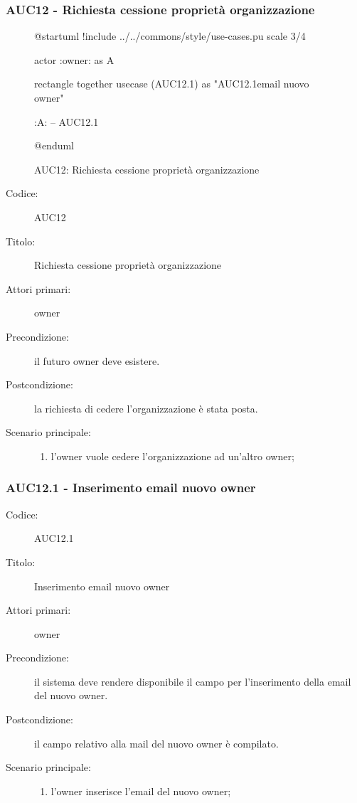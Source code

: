 \documentclass[../analisi-dei-requisiti.tex]{subfiles}
\begin{document}
\subsubsection{AUC12 - Richiesta cessione proprietà organizzazione}%
\label{subsub:AUC12}

\begin{figure}[h!]
  \centering
  \begin{plantuml}
  @startuml
  !include ../../commons/style/use-cases.pu
  scale 3/4

  actor :owner: as A

  rectangle {
    together {
      usecase (AUC12.1) as "AUC12.1\nInserimento email nuovo owner"
    }
  }

  :A: -- AUC12.1

  @enduml
  \end{plantuml}
  \caption{AUC12: Richiesta cessione proprietà organizzazione}
  \label{fig:auc12}
\end{figure}

\begin{description}
  \item[Codice:] AUC12
  \item[Titolo:] Richiesta cessione proprietà organizzazione
  \item[Attori primari:] owner
  \item[Precondizione:] il futuro owner deve esistere.
  \item[Postcondizione:] la richiesta di cedere l'organizzazione è stata posta.
  \item[Scenario principale:]
  \begin{enumerate}
    \item l'owner vuole cedere l'organizzazione ad un'altro owner;
  \end{enumerate}
\end{description}

\subsubsection{AUC12.1 - Inserimento email nuovo owner}%
\label{subsub:AUC12.1}
\begin{description}
  \item[Codice:] AUC12.1
  \item[Titolo:] Inserimento email nuovo owner
  \item[Attori primari:] owner
  \item[Precondizione:] il sistema deve rendere disponibile il campo per l'inserimento della email del nuovo owner.
  \item[Postcondizione:] il campo relativo alla mail del nuovo owner è compilato.
  \item[Scenario principale:]
  \begin{enumerate}
    \item l'owner inserisce l'email del nuovo owner;
  \end{enumerate}
\end{description}
\end{document}
